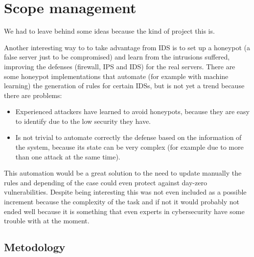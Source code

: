 \section{Scope management}

We had to leave behind some ideas because the kind of project this is.

\linej
\linej
Another interesting way to to take advantage from IDS is to set up a honeypot (a false server just to be compromised) and learn from the intrusions suffered, improving the defenses (firewall, IPS and IDS) for the real servers. There are some honeypot implementations that automate (for example with machine learning) the generation of rules for certain IDSs, but is not yet a trend because there are problems:
\begin{itemize}
	\item Experienced attackers have learned to avoid honeypots, because they are easy to identify due to the low security they have.
	\item Is not trivial to automate correctly the defense based on the information of the system, because its state can be very complex (for example due to more than one attack at the same time).
\end{itemize}
\linej
This automation would be a great solution to the need to update manually the rules and depending of the case could even protect against day-zero vulnerabilities. Despite being interesting this was not even included as a possible increment because the complexity of the task and if not it would probably not ended well because it is something that even experts in cybersecurity have some trouble with at the moment.



\subsection{Metodology}





